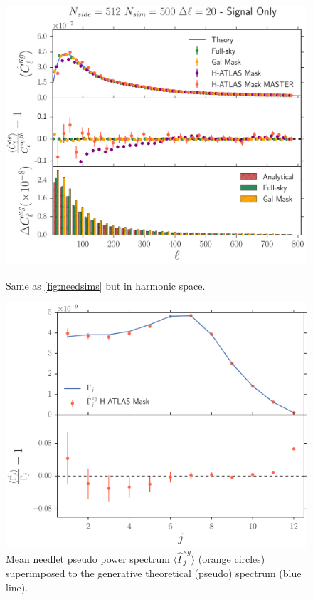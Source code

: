 \documentclass[a4paper,11pt]{article}
\begin{document}
%
\begin{figure}[t]
    \centering
    \begin{minipage}{.5\textwidth}
        \centering
        \includegraphics[width=\textwidth]{images/pipeline_val_cl_nside512_nsim500.pdf}
	\caption{\label{fig:clsims} Same as \ref{fig:needsims} but in harmonic space. }
    \end{minipage}%
    \begin{minipage}{0.5\textwidth}
        \centering
        \includegraphics[width=\textwidth]{images/master_beta.pdf}
        \caption{Mean needlet pseudo power spectrum $\langle \hat{\Gamma}^{\kappa g}_j\rangle$ 
        (orange circles) superimposed to the generative theoretical (pseudo) spectrum (blue line).}
        \label{fig:gammaj}
    \end{minipage}
\end{figure}
\end{document}
